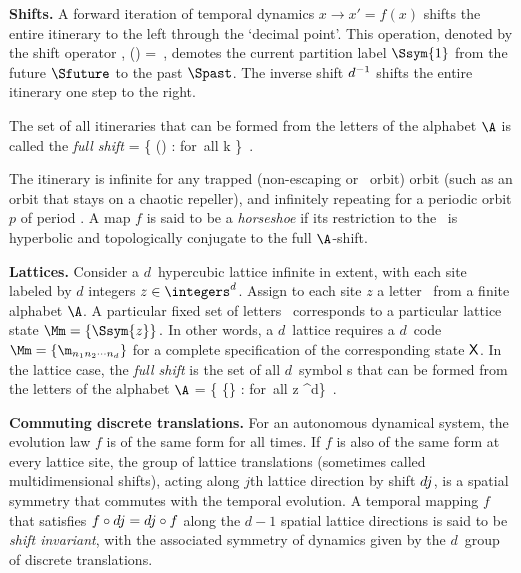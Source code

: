 {\bf Shifts.}
A forward iteration of temporal dynamics $x\rightarrow x' = f(x)$ shifts
the entire itinerary to the left through the `decimal point'. This
operation, denoted by the shift operator \shift{},
\beq
   \shift{}()
     =  
\,,
demotes the current partition label $\Ssym{1}$ from the future $\Sfuture$
to the past $\Spast$.
The inverse shift $d{}^{-1}$ shifts the entire itinerary one step
to the right.

The set of all itineraries that can be formed from the letters of the
alphabet $\A$ is called the {\em full shift}
\beq
\hat{\AdmItnr} = \{ ()
              :  \in \A \quad \mbox{for all} \quad k \in  \integers \}
\,.

The itinerary is infinite for any trapped (non-escaping or \nws\ orbit) orbit
(such as an orbit that stays on a chaotic
repeller), and infinitely repeating for a periodic orbit $p$ of period .
A map $f$ is said to be a \emph{horseshoe} if its restriction to the \nws\ is
hyperbolic and topologically conjugate to the full $\A$-shift.

{\bf Lattices.}
Consider a $d$\dmn\ hypercubic lattice infinite in extent, with each site
labeled by $d$ integers $z\in \integers^{d}$. Assign to each site $z$ a
letter \ from a finite alphabet $\A$. A particular fixed set
of letters  \ corresponds to a particular lattice state
\(
\Mm= \{\Ssym{z}\} %
\,.
\)
In other words, a $d$\dmn\ lattice requires a {$d$\dmn\ code}
\(
\Mm = \{\m_{n_1 n_2 \cdots n_d}\}
\)
for a complete specification of the corresponding state $\mathsf{X}$.
In the lattice case, the {\em full shift} is the set of all $d$\dmn\
symbol \brick s that can be formed from the letters of the alphabet $\A$
\beq
\hat{\AdmItnr} = \{ \{\} %
              : \Ssym{z} \in \A \quad \mbox{for all} \quad z \in  \integers^d\}
\,.

{\bf Commuting discrete translations.}
For an autonomous dynamical system, the evolution law $f$ is of the same form for
all times. If $f$ is also of the same form at every lattice site, the group of
lattice translations (sometimes called multidimensional shifts), acting along
$j$th lattice direction by shift $d{j}$, is a spatial symmetry that commutes
with the temporal evolution. A temporal mapping $f$ that satisfies
$f\circ d{j}=d{j}\circ{f}$ along the $d\!-\!1$ spatial lattice directions
is said to be {\em shift invariant}, with the associated symmetry of dynamics
given by the $d$\dmn\ group of discrete {\spt} translations.


